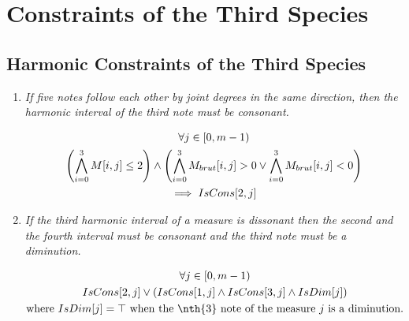 \section*{Constraints of the Third Species}
\subsection*{Harmonic Constraints of the Third Species}
\begin{enumerate}[wide, label=\bfseries 3.H\arabic*]
  \item\label{rule:fivequarters}{ \textit{If five notes follow each other by joint degrees in the same direction, then the harmonic interval of the third note must be consonant.}}

\begin{equation}
    \begin{gathered}
        \forall j \in [0, m-1)\\
        \left(
            \bigwedge_{i=0}^{3} M[i, j] \leq 2
        \right)
        \land
        \left(
            \bigwedge_{i=0}^{3} M_{brut}[i, j] > 0
            \lor
            \bigwedge_{i=0}^{3} M_{brut}[i, j] < 0
        \right)\\
        \implies IsCons[2, j]
    \end{gathered}
\end{equation}


\item\label{rule:thirddiss} {\textit{If the third harmonic interval of a measure is dissonant then the second and the fourth interval must be consonant and the third note must be a diminution.}}


\begin{equation}
    \begin{gathered}
        \forj\\
        IsCons[2, j] \lor \left( IsCons[1, j] \land IsCons[3, j] \land IsDim[j]\right)\\
        \text{where } IsDim[j]=\top \text{ when the \nth{3} note of the measure } j \text{ is a diminution.}
    \end{gathered}
\end{equation}


\end{enumerate}
